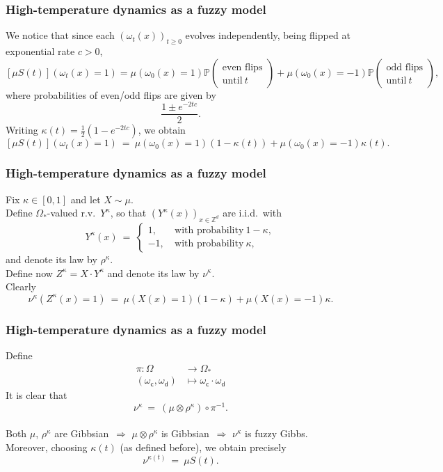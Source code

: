 \documentclass{beamer}
\renewcommand{\P}{\mathbb{P}}
\newcommand{\Z}{\mathbb{Z}}
\newcommand{\oklepaj}[1]{\left(#1\right)}
\newcommand{\ra}{\rightarrow}
\newcommand{\1}{\mathbbm{1}}
\newcommand{\5}{\vspace{0.5cm}}
\newcommand{\3}{\vspace{0.3cm}}
\theoremstyle{definition}
\begin{document}

\begin{frame}
\frametitle{High-temperature dynamics as a fuzzy model}
We notice that since each $(\omega_t(x))_{t\geq 0}$ evolves independently, being flipped at exponential rate $c>0$, \pause
$$[\mu S(t)](\omega_t(x)=1) = \mu(\omega_0(x)=1)\P\!\oklepaj{\substack{\text{even flips}\\\text{until}~t}}+\mu(\omega_0(x)=-1)\P\!\oklepaj{\substack{\text{odd flips}\\\text{until}~t}},$$\pause
where probabilities of even/odd flips are given by
$$\frac{1\pm e^{-2tc}}{2}.$$\pause
Writing $\kappa(t)=\frac{1}{2}(1-e^{-2tc})$, we obtain
$$[\mu S(t)](\omega_t(x)=1) ~=~ \mu(\omega_0(x)=1)(1-\kappa(t))+\mu(\omega_0(x)=-1)\kappa(t).$$
\end{frame}

\begin{frame}
\frametitle{High-temperature dynamics as a fuzzy model}
Fix $\kappa\in[0,1]$ and let $X\sim\mu$.\\\vspace{0.5cm}\pause
Define $\Omega_*$-valued r.v.~$Y^\kappa$, so that $(Y^\kappa(x))_{x\in\Z^d}$ are i.i.d.~with
$$Y^\kappa(x) ~=~ \begin{cases}
1, ~&\text{with probability}~1-\kappa,\\
-1, ~&\text{with probability}~\kappa,
\end{cases}$$
and denote its law by $\rho^\kappa$. \\\vspace{0.5cm}\pause
Define now $Z^\kappa=X\cdot Y^\kappa$ and denote its law by $\nu^\kappa$. \\\vspace{0.5cm}\pause
Clearly
$$\nu^\kappa(Z^\kappa(x)=1) ~=~ \mu(X(x)=1)(1-\kappa) + \mu(X(x)=-1)\kappa.$$
\end{frame}

\begin{frame}
\frametitle{High-temperature dynamics as a fuzzy model}
Define
\begin{align*}
\pi:\Omega&\ra\Omega_*\\
(\omega_\mathsf{c},\omega_\mathsf{d})&\mapsto\omega_\mathsf{c}\cdot\omega_\mathsf{d}
\end{align*}\pause
It is clear that
$$\nu^\kappa ~=~ (\mu\otimes\rho^\kappa)\circ\pi^{-1}.$$\\\vspace{0.2cm}\pause
Both $\mu$, $\rho^{\kappa}$ are Gibbsian\pause~$\Rightarrow$ $\mu\otimes\rho^{\kappa}$ is Gibbsian\pause~$\Rightarrow$ $\nu^\kappa$ is fuzzy Gibbs.\\\vspace*{0.5cm}\pause
Moreover, choosing $\kappa(t)$ (as defined before), we obtain precisely
$$\nu^{\kappa(t)} ~=~ \mu S(t).$$
\end{frame}
\end{document}
